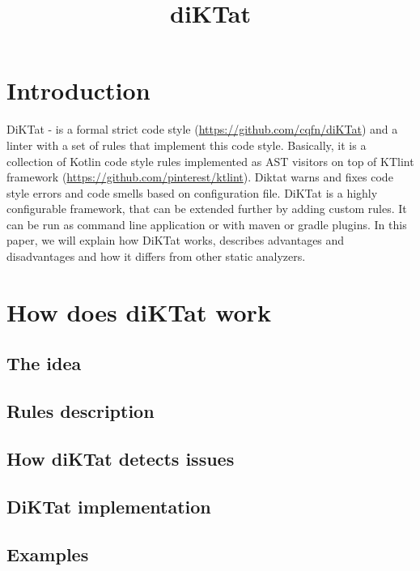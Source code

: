 \documentclass{article}
\title{diKTat}
\begin{document}
\maketitle

\newpage

\tableofcontents

\newpage

\section{Introduction}
\par
DiKTat - is a formal strict code style (\url{https://github.com/cqfn/diKTat}) and a linter with a set of rules that implement this code style. Basically, it is a collection of Kotlin code style rules implemented as AST visitors on top of KTlint framework (\url{https://github.com/pinterest/ktlint}). Diktat warns and fixes code style errors and code smells based on configuration file. DiKTat is a highly configurable framework, that can be extended further by adding custom rules. It can be run as command line application or with maven or gradle plugins. In this paper, we will explain how DiKTat works, describes advantages and disadvantages and how it differs from other static analyzers.

\newpage

\section{How does diKTat work}
\subsection{The idea}
\subsection{Rules description}
\subsection{How diKTat detects issues}
\subsection{DiKTat implementation}
\subsection{Examples}

\newpage
\end{document}

